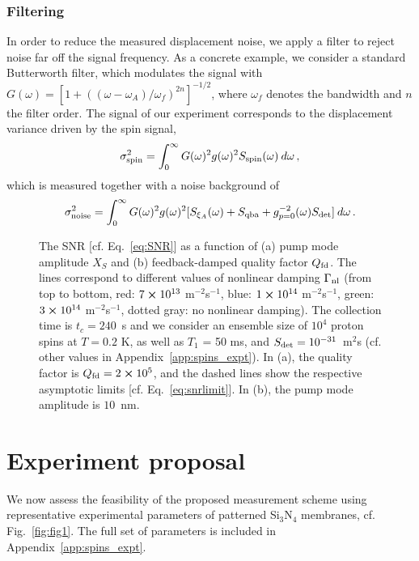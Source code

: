 \subsubsection{Filtering} In order to reduce the measured displacement noise, we apply a filter to reject noise far off the signal frequency. As a concrete example, we consider a standard Butterworth filter, which modulates the signal with $G(\omega) = [1 + ((\omega - \omega_A)/\omega_f)^{2 n}]^{-1/2}$, where $\omega_f$ denotes the bandwidth and $n$ the filter order. The signal of our experiment corresponds to the displacement variance driven by the spin signal,
\begin{equation} \label{eq:signal}
\sigma_{\rm spin}^2 = \int_{0}^{\infty} G(\omega)^2  g(\omega)^2 S_{\rm spin} (\omega) \: d\omega \,,
\end{equation}
which is measured together with a noise background of
\begin{equation} \label{eq:noise}
\sigma_{\rm noise}^2 = \int_{0}^{\infty} G(\omega)^2 g(\omega)^2[S_{\xi_A}(\omega) + S_{\rm qba} + g_{p=0}^{-2}(\omega) S_{\rm det}]\: d\omega \,.
\end{equation}
%
\begin{figure}
	\centering
	\hspace*{-5mm}
	
	\caption{The SNR [cf. Eq.~\eqref{eq:SNR}] as a function of (a) pump mode amplitude $X_S$ and (b) feedback-damped quality factor $Q_{\rm fd}$. The lines correspond to different values of nonlinear damping $\Gamma_{\rm nl}$ (from top to bottom, red: $7\cross10^{13}$ m$^{-2}$s$^{-1}$, blue: $1\cross10^{14}$ m$^{-2}$s$^{-1}$, green: $3\cross10^{14}$ m$^{-2}$s$^{-1}$, dotted gray: no nonlinear damping). The collection time is $t_c = 240$~s and we consider an ensemble size of $10^4$ proton spins at $T = 0.2$ K, as well as $T_1$ = 50 ms, and $S_{\rm det} =  10^{-31}$~m$^2$\;s (cf. other values in Appendix~\ref{app:spins_expt}). In (a), the quality factor is $Q_{\rm fd} =2 \cross 10^5$, and the dashed lines show the respective asymptotic limits [cf. Eq.~\eqref{eq:snrlimit}]. In (b), the pump mode amplitude is $10$~nm.}
	\label{fig:snr}
\end{figure}
%
\section{Experiment proposal} \label{sec:spins_disc}
We now assess the feasibility of the proposed measurement scheme using representative experimental parameters of patterned Si$_3$N$_4$ membranes, cf. Fig.~\ref{fig:fig1}. The full set of parameters is included in Appendix~\ref{app:spins_expt}.

